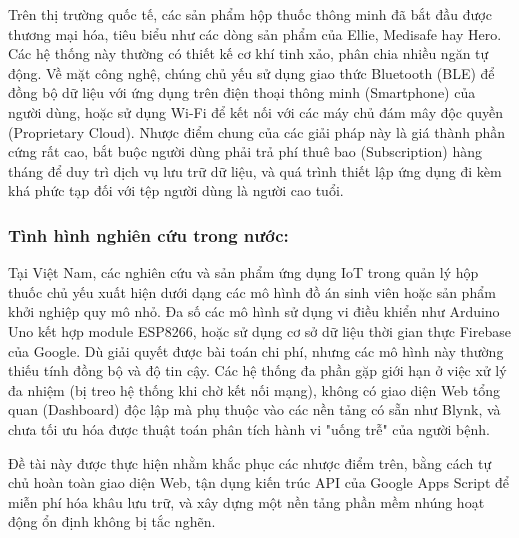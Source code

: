 \documentclass[12pt, a4paper, oneside]{article}
\begin{document}
Trên thị trường quốc tế, các sản phẩm hộp thuốc thông minh đã bắt đầu được thương mại hóa, tiêu biểu như các dòng sản phẩm của Ellie, Medisafe hay Hero. Các hệ thống này thường có thiết kế cơ khí tinh xảo, phân chia nhiều ngăn tự động. Về mặt công nghệ, chúng chủ yếu sử dụng giao thức Bluetooth (BLE) để đồng bộ dữ liệu với ứng dụng trên điện thoại thông minh (Smartphone) của người dùng, hoặc sử dụng Wi-Fi để kết nối với các máy chủ đám mây độc quyền (Proprietary Cloud). Nhược điểm chung của các giải pháp này là giá thành phần cứng rất cao, bắt buộc người dùng phải trả phí thuê bao (Subscription) hàng tháng để duy trì dịch vụ lưu trữ dữ liệu, và quá trình thiết lập ứng dụng đi kèm khá phức tạp đối với tệp người dùng là người cao tuổi.

\subsubsection{Tình hình nghiên cứu trong nước:} 

Tại Việt Nam, các nghiên cứu và sản phẩm ứng dụng IoT trong quản lý hộp thuốc chủ yếu xuất hiện dưới dạng các mô hình đồ án sinh viên hoặc sản phẩm khởi nghiệp quy mô nhỏ. Đa số các mô hình sử dụng vi điều khiển như Arduino Uno kết hợp module ESP8266, hoặc sử dụng cơ sở dữ liệu thời gian thực Firebase của Google. Dù giải quyết được bài toán chi phí, nhưng các mô hình này thường thiếu tính đồng bộ và độ tin cậy. Các hệ thống đa phần gặp giới hạn ở việc xử lý đa nhiệm (bị treo hệ thống khi chờ kết nối mạng), không có giao diện Web tổng quan (Dashboard) độc lập mà phụ thuộc vào các nền tảng có sẵn như Blynk, và chưa tối ưu hóa được thuật toán phân tích hành vi "uống trễ" của người bệnh.

Đề tài này được thực hiện nhằm khắc phục các nhược điểm trên, bằng cách tự chủ hoàn toàn giao diện Web, tận dụng kiến trúc API của Google Apps Script để miễn phí hóa khâu lưu trữ, và xây dựng một nền tảng phần mềm nhúng hoạt động ổn định không bị tắc nghẽn.
\end{document}
